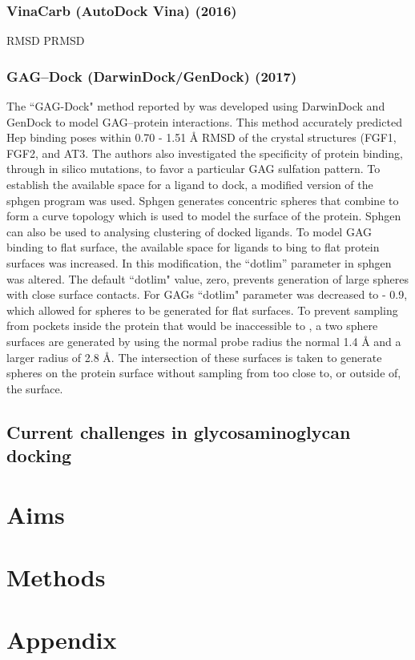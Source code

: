 \documentclass[journal=jctcce,manuscript=article]{achemso}
\begin{document}
{\subsubsection{VinaCarb (AutoDock Vina) (2016)}
\ac{RMSD}
\ac{PRMSD}

\subsubsection{GAG--Dock (DarwinDock/GenDock) (2017)}
The ``GAG-Dock" method reported by
\citeauthor{Griffith2017PredictingGrowth}\cite{Griffith2017PredictingGrowth} was developed using DarwinDock and GenDock to model GAG--protein interactions. This method accurately predicted \ac{Hep} binding poses within 0.70 - 1.51 \r{A} \ac{RMSD} of the crystal structures (\ac{FGF1}, \ac{FGF2}, and \ac{AT3}. The authors also investigated the specificity of protein binding, through in silico mutations, to favor a particular GAG sulfation pattern. 
To establish the available space for a ligand to dock, a modified version of the sphgen program\cite{Moustakas2006Development5} was used. Sphgen generates concentric spheres that combine to form a curve topology which is used to model the surface of the protein. 
Sphgen can also be used to analysing clustering of docked ligands.\cite{Hendrix1998SurfaceDocking.}
To model \ac{GAG} binding to flat surface, the available space for ligands to bing to flat protein surfaces was increased. In this modification, the “dotlim” parameter in sphgen was altered. The default ``dotlim" value, zero, prevents generation of large spheres with close surface contacts.\cite{Hendrix1998SurfaceDocking.} For \acp{GAG} ``dotlim" parameter was decreased to - 0.9, which allowed for spheres to be generated for flat surfaces.\cite{Griffith2017PredictingGrowth} To prevent sampling from pockets inside the protein that would be inaccessible to , a two sphere surfaces are generated by using the normal probe radius the normal 1.4 \r{A} and a larger radius of 2.8 \r{A}. The intersection of these surfaces is taken to generate spheres on the protein surface without sampling from too close to, or outside of, the surface.\cite{Griffith2017PredictingGrowth} 

\subsection{Current challenges in glycosaminoglycan docking}

\pagebreak
\section{Aims}

\section{Methods}


}
\newpage
{

}
\newpage
\section{Appendix}
\end{document}
